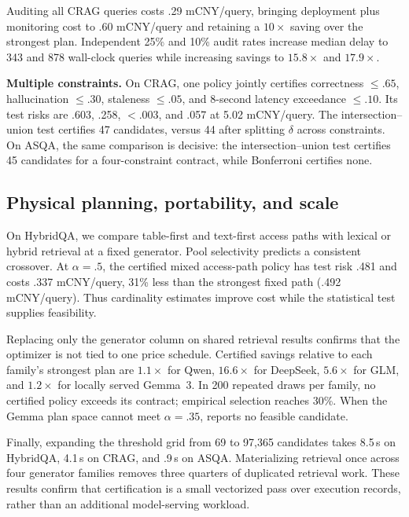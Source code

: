 Auditing all CRAG queries costs .29 mCNY/query, bringing deployment plus
monitoring cost to .60 mCNY/query and retaining a $10\times$ saving over
the strongest plan. Independent 25\% and 10\% audit rates increase median
delay to 343 and 878 wall-clock queries while increasing savings to
$15.8\times$ and $17.9\times$.

\textbf{Multiple constraints.}
On CRAG, one policy jointly certifies correctness $\leq.65$,
hallucination $\leq.30$, staleness $\leq.05$, and 8-second latency
exceedance $\leq.10$. Its test risks are .603, .258, $<.003$, and .057 at
5.02 mCNY/query. The intersection--union test certifies 47 candidates,
versus 44 after splitting $\delta$ across constraints. On ASQA, the same
comparison is decisive: the intersection--union test certifies 45
candidates for a four-constraint contract, while Bonferroni certifies
none.

\subsection{Physical planning, portability, and scale}
\label{sec:exp-system}

On HybridQA, we compare table-first and text-first access paths with
lexical or hybrid retrieval at a fixed generator. Pool selectivity predicts
a consistent crossover. At $\alpha=.5$, the certified mixed access-path
policy has test risk .481 and costs .337 mCNY/query, 31\% less than the
strongest fixed path (.492 mCNY/query). Thus cardinality estimates improve
cost while the statistical test supplies feasibility.

Replacing only the generator column on shared retrieval results confirms
that the optimizer is not tied to one price schedule. Certified savings
relative to each family's strongest plan are $1.1\times$ for Qwen,
$16.6\times$ for DeepSeek, $5.6\times$ for GLM, and $1.2\times$ for
locally served Gemma~3. In 200 repeated draws per family, no certified
policy exceeds its contract; empirical selection reaches 30\%. When the
Gemma plan space cannot meet $\alpha=.35$, \system reports no feasible
candidate.

Finally, expanding the threshold grid from 69 to 97,365 candidates takes
8.5\,s on HybridQA, 4.1\,s on CRAG, and .9\,s on ASQA. Materializing
retrieval once across four generator families removes three quarters of
duplicated retrieval work. These results confirm that certification is a
small vectorized pass over execution records, rather than an additional
model-serving workload.
